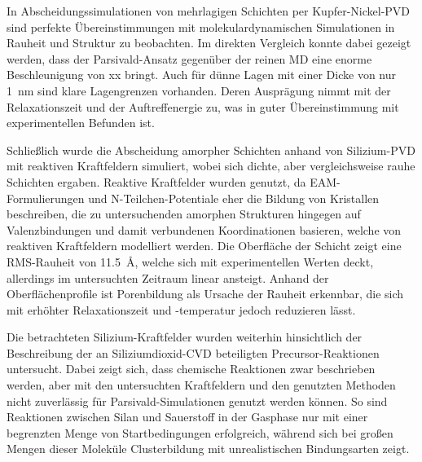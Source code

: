 In Abscheidungssimulationen von mehrlagigen Schichten per Kupfer-Nickel-PVD sind perfekte Übereinstimmungen mit molekulardynamischen Simulationen in Rauheit und Struktur zu beobachten.
Im direkten Vergleich konnte dabei gezeigt werden, dass der Parsivald-Ansatz gegenüber der reinen MD eine enorme Beschleunigung von xx bringt.
Auch für dünne Lagen mit einer Dicke von nur \SI{1}{\nano\meter} sind klare Lagengrenzen vorhanden.
Deren Ausprägung nimmt mit der Relaxationszeit und der Auftreffenergie zu, was in guter Übereinstimmung mit experimentellen Befunden ist.

Schließlich wurde die Abscheidung amorpher Schichten anhand von Silizium-PVD mit reaktiven Kraftfeldern simuliert, wobei sich dichte, aber vergleichsweise rauhe Schichten ergaben.
Reaktive Kraftfelder wurden genutzt, da EAM-Formulierungen und N-Teilchen-Potentiale eher die Bildung von Kristallen beschreiben, die zu untersuchenden amorphen Strukturen hingegen auf Valenzbindungen und damit verbundenen Koordinationen basieren, welche von reaktiven Kraftfeldern modelliert werden.
Die Oberfläche der Schicht zeigt eine RMS-Rauheit von \SI{11.5}{\angstrom}, welche sich mit experimentellen Werten deckt, allerdings im untersuchten Zeitraum linear ansteigt.
Anhand der Oberflächenprofile ist Porenbildung als Ursache der Rauheit erkennbar, die sich mit erhöhter Relaxationszeit und -temperatur jedoch reduzieren lässt.


Die betrachteten Silizium-Kraftfelder wurden weiterhin hinsichtlich der Beschreibung der an Siliziumdioxid-CVD beteiligten Precursor-Reaktionen untersucht.
Dabei zeigt sich, dass chemische Reaktionen zwar beschrieben werden, aber mit den untersuchten Kraftfeldern und den genutzten Methoden nicht zuverlässig für Parsivald-Simulationen genutzt werden können.
So sind Reaktionen zwischen Silan und Sauerstoff in der Gasphase nur mit einer begrenzten Menge von Startbedingungen erfolgreich, während sich bei großen Mengen dieser Moleküle Clusterbildung mit unrealistischen Bindungsarten zeigt.

